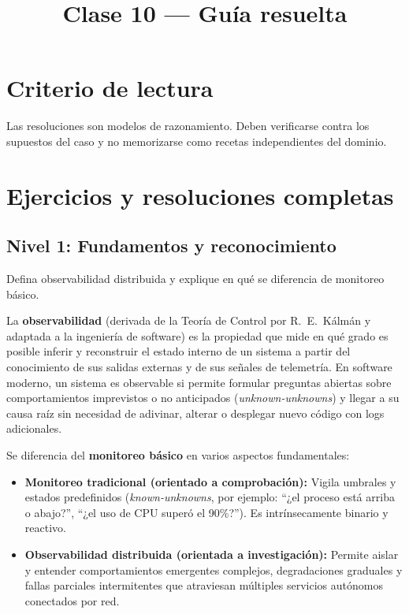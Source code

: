 \documentclass[variant=guia,cover=institutional,mode=screen]{ua-engineering-v6-article}
\title{Clase 10 --- Guía resuelta}
\author{\UAProfessor}
\date{\UADate}
\begin{document}
\section{Criterio de lectura}
Las resoluciones son modelos de razonamiento. Deben verificarse contra los supuestos del caso y no memorizarse como recetas independientes del dominio.

\section{Ejercicios y resoluciones completas}

\subsection*{Nivel 1: Fundamentos y reconocimiento}

\begin{uaexercise}
Defina observabilidad distribuida y explique en qué se diferencia de monitoreo básico.
\end{uaexercise}
\begin{uaanswer}
La \textbf{observabilidad} (derivada de la Teoría de Control por R.~E.~Kálmán y adaptada a la ingeniería de software) es la propiedad que mide en qué grado es posible inferir y reconstruir el estado interno de un sistema a partir del conocimiento de sus salidas externas y de sus señales de telemetría. En software moderno, un sistema es observable si permite formular preguntas abiertas sobre comportamientos imprevistos o no anticipados (\emph{unknown-unknowns}) y llegar a su causa raíz sin necesidad de adivinar, alterar o desplegar nuevo código con logs adicionales.

Se diferencia del \textbf{monitoreo básico} en varios aspectos fundamentales:
\begin{itemize}
\item \textbf{Monitoreo tradicional (orientado a comprobación):} Vigila umbrales y estados predefinidos (\emph{known-unknowns}, por ejemplo: ``¿el proceso está arriba o abajo?'', ``¿el uso de CPU superó el 90\%?''). Es intrínsecamente binario y reactivo.
\item \textbf{Observabilidad distribuida (orientada a investigación):} Permite aislar y entender comportamientos emergentes complejos, degradaciones graduales y fallas parciales intermitentes que atraviesan múltiples servicios autónomos conectados por red.
\end{itemize}
\end{uaanswer}
\end{document}
